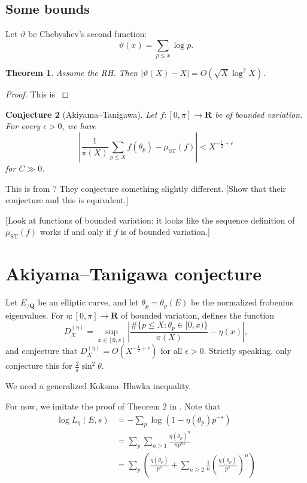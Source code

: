 \documentclass{article}
\DeclareMathOperator{\ST}{ST}
\newcommand{\bQ}{\mathbf{Q}}
\newcommand{\bR}{\mathbf{R}}
\newtheorem{theorem}{Theorem}
\newtheorem{conjecture}[theorem]{Conjecture}
\numberwithin{theorem}{section}
\begin{document}
\subsection{Some bounds}

Let $\vartheta$ be Chebyshev's second function:
\[
	\vartheta(x) = \sum_{p\leqslant x} \log p .
\]

\begin{theorem}
Assume the RH. Then $|\vartheta(X)-X| = O(\sqrt X\log^2 X)$. 
\end{theorem}
\begin{proof}
This is \cite[Th.~10]{schoenfeld1976}
\end{proof}

\begin{conjecture}[Akiyama--Tanigawa]
Let $f\colon [0,\pi]\to \bR$ be of bounded variation. For every $\epsilon>0$, 
we have 
\[
	\left|\frac{1}{\pi(X)} \sum_{p\leqslant X} f(\theta_p) - \mu_{\mathrm{ST}}(f)\right| < X^{-\frac 1 2 + \epsilon}
\]
for $C\gg 0$. 
\end{conjecture}

This is from \cite{akiyama-tanigawa}? They conjecture something slightly 
different. [Show that their conjecture and this is equivalent.]

[Look at functions of bounded variation: it looks like the sequence 
definition of $\mu_{\ST}(f)$ works if and only if $f$ is of bounded 
variation.]





\section{Akiyama--Tanigawa conjecture}

Let $E_{/\bQ}$ be an elliptic curve, and let $\theta_p=\theta_p(E)$ be the 
normalized frobenius eigenvalues. For $\eta\colon [0,\pi]\to \bR$ of bounded 
variation, \cite{akiyama-tanigawa} defines the function 
\[
	D_X^{(\eta)} = \sup_{x\in [0,\pi]} \left|\frac{\#\{p\leqslant X : \theta_p\in [0,x)\}}{\pi(X)} - \eta(x)\right| ,
\]
and conjecture that $D_X^{(\eta)} = O(X^{-\frac 1 2+\epsilon})$ for all 
$\epsilon>0$. Strictly speaking, \cite{akiyama-tanigawa} only conjecture this 
for $\frac{2}{\pi}\sin^2\theta$. 

We need a generalized Koksma--Hlawka inequality.

For now, we imitate the proof of Theorem 2 in \cite{akiyama-tanigawa}. Note 
that 
\begin{align*}
	\log L_\eta(E,s) &= -\sum_p \log(1-\eta(\theta_p)p^{-s}) \\
		&= \sum_p \sum_{n\geqslant 1} \frac{\eta(\theta_p)^n}{n p^{n s}} \\
		&= \sum_p\left(\frac{\eta(\theta_p)}{p^s} + \sum_{n\geqslant 2} \frac{1}{n} \left(\frac{\eta(\theta_p)}{p^s}\right)^n\right)
\end{align*}
\end{document}
